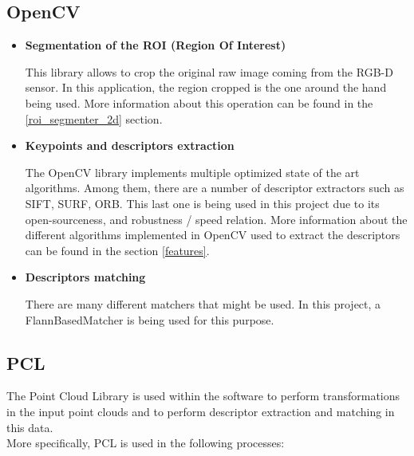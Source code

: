 	\subsection{OpenCV}
		\begin{itemize}
		\item\textbf{Segmentation of the ROI (Region Of Interest)\\ }

		This library allows to crop the original raw image coming
		from the RGB-D sensor. In this application, the region cropped is the one around the hand being used. More information about this operation can be found in the \ref{roi_segmenter_2d} section. 
		

		\item\textbf{ {Keypoints and descriptors extraction\\ }}

		 The OpenCV library implements multiple optimized state of the art algorithms. Among them, there are a number of descriptor extractors such as SIFT, SURF, ORB. This last one is being used in this project due to its open-sourceness, and robustness / speed relation. More information about the different algorithms implemented in OpenCV used to extract the descriptors can be found in the section \ref{features}.


		\item\textbf{ {Descriptors matching\\ } }

		There are many different matchers that might be used. In this project, a FlannBasedMatcher
		is being used for this purpose. 
		\end{itemize}

	\subsection{PCL}
		The Point Cloud Library is used within the software to perform transformations in the input point clouds and to perform descriptor extraction and matching in this data. 
		\\

		More specifically, PCL is used in the following processes: 


